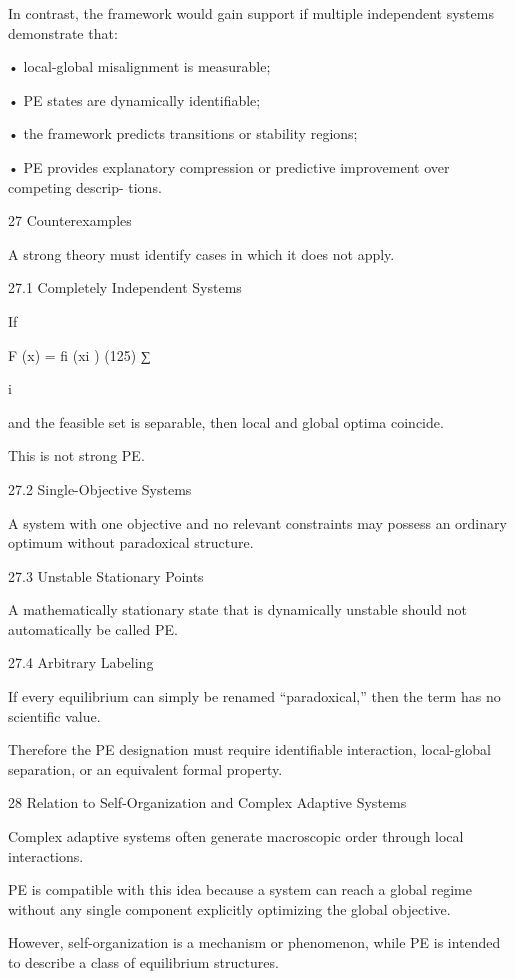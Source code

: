\documentclass[10pt,a4paper]{article}
\begin{document}
\begin{ManuscriptText}
In contrast, the framework would gain support if multiple independent systems demonstrate
that:


     • local-global misalignment is measurable;

     • PE states are dynamically identifiable;

     • the framework predicts transitions or stability regions;

     • PE provides explanatory compression or predictive improvement over competing descrip-
        tions.


27       Counterexamples

A strong theory must identify cases in which it does not apply.


27.1      Completely Independent Systems

If


                                         F (x) =        fi (xi )                          (125)
                                                   ∑︂

                                                   i

and the feasible set is separable, then local and global optima coincide.

This is not strong PE.


27.2      Single-Objective Systems

A system with one objective and no relevant constraints may possess an ordinary optimum
without paradoxical structure.


27.3      Unstable Stationary Points

A mathematically stationary state that is dynamically unstable should not automatically be
called PE.


27.4    Arbitrary Labeling

If every equilibrium can simply be renamed “paradoxical,” then the term has no scientific value.

Therefore the PE designation must require identifiable interaction, local-global separation, or an
equivalent formal property.


28     Relation to Self-Organization and Complex Adaptive Systems

Complex adaptive systems often generate macroscopic order through local interactions.

PE is compatible with this idea because a system can reach a global regime without any single
component explicitly optimizing the global objective.

However, self-organization is a mechanism or phenomenon, while PE is intended to describe a
class of equilibrium structures.


\end{ManuscriptText}
\end{document}
